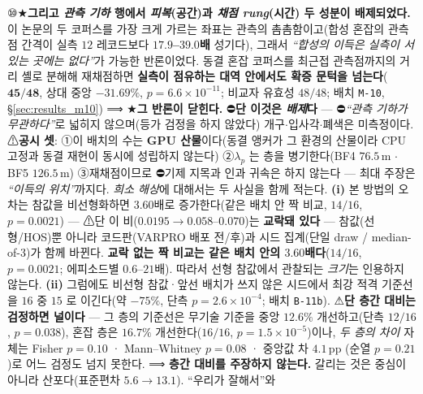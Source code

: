 \documentclass[11pt]{report}
\numberwithin{equation}{chapter}
\numberwithin{figure}{chapter}
\numberwithin{table}{chapter}
\begin{document}
\begin{enumerate}
        ⑩★\textbf{그리고 \emph{관측 기하} 행에서 \emph{피복}(공간)과 \emph{채점 rung}(시간)
        두 성분이 배제되었다.} 이 논문의
        두 코퍼스를 가장 크게 가르는 좌표는 관측의 촘촘함이고(합성 혼잡의 관측점 간격이
        실측 $12$ 레코드보다 \textbf{$17.9$--$39.0$배} 성기다), 그래서 \emph{``합성의
        이득은 실측이 서 있는 곳에는 없다''}가 가능한 반론이었다. 동결 혼잡 코퍼스를
        최근접 관측점까지의 거리 셸로 분해해 재채점하면 \textbf{실측이 점유하는 대역
        안에서도 확증 문턱을 넘는다}($\mathbf{45/48}$, 상대 중앙 $\mathbf{-31.69\%}$,
        $p = 6.6\times10^{-11}$; 비교자 유효성 $48/48$; 배치 \texttt{M-10},
        \S\ref{sec:results_m10}) ⟹ ★\textbf{그 반론이 닫힌다.}
        ⛔\textbf{단 이것은 \emph{배제}다} --- ⛔\emph{``관측 기하가 무관하다''}로 넓히지
        않으며(등가 검정을 하지 않았다) 개구$\cdot$입사각$\cdot$폐색은 미측정이다.
        ⚠\textbf{공시 셋}: ①이 배치의 수는 \textbf{GPU 산물}이다(동결 앵커가 그 환경의
        산물이라 CPU 고정과 동결 재현이 동시에 성립하지 않는다) ②$\lambda_p$ 는 층을
        병기한다(BF4 $76.5$\,m $\cdot$ BF5 $126.5$\,m) ③재채점이므로 ⛔기제 지목과 인과
        귀속은 하지 않는다 --- 최대 주장은 \emph{``이득의 위치''}까지다.
        \emph{희소 해상}에 대해서는 두 사실을 함께 적는다. \textbf{(i)} 본 방법의 오차는
        참값을 비선형화하면 $3.60$배로 증가한다(같은 배치 안 짝 비교, $14/16$, $p = 0.0021$)
        --- ⚠단 이 비($0.0195 \to 0.058$--$0.070$)는 \textbf{교락돼 있다} --- 참값(선형/HOS)뿐 아니라 코드판(VARPRO 배포 전/후)과 시드 집계(단일 draw / median-of-3)가 함께 바뀐다. \textbf{교락 없는 짝 비교는 같은 배치 안의 $3.60$배다}($14/16$, $p = 0.0021$; 에피소드별 $0.6$--$21$배). 따라서
        선형 참값에서 관찰되는 \emph{크기}는 인용하지 않는다. \textbf{(ii)} 그럼에도 비선형
        참값·앞선 배치가 쓰지 않은 시드에서 최강 적격 기준선을 $16$ 중 $15$ 로 이긴다(약 $-75\%$,
        단측 $p = 2.6\times10^{-4}$; 배치 \texttt{B-11b}). ⚠\textbf{단 층간 대비는 검정하면 널이다} --- 그 층의 기준선은 무기술 기준을 중앙 $12.6\%$ 개선하고(단측 $12/16$, $p = 0.038$), 혼잡 층은 $16.7\%$ 개선한다($16/16$, $p = 1.5\times10^{-5}$)이나, \emph{두 층의 차이} 자체는 Fisher $p = 0.10$ · Mann--Whitney $p = 0.08$ · 중앙값 차 $4.1$\,pp (순열 $p = 0.21$)로 어느 검정도 넘지 못한다. ⟹ \textbf{층간 대비를 주장하지 않는다.} 갈리는 것은 중심이 아니라 산포다(표준편차 $5.6 \to 13.1$). ``우리가 잘해서''와

\end{enumerate}
\end{document}
